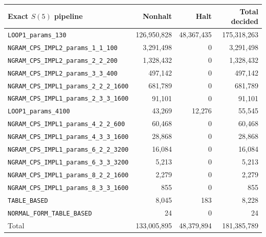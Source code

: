 \documentclass[a4paper,british]{article}
\theoremstyle{definition} %
\numberwithin{equation}{section}
\theoremstyle{definition} %
\begin{document}
\begin{table}[H]
    \centering

    \begin{tabular}{|lrrr|}
        \hline
        Exact $S(5)$ pipeline                             & Nonhalt         & Halt           & Total decided   \\
        \hline
        \texttt{LOOP1\_params\_130}                       & 126{,}950{,}828 & 48{,}367{,}435 & 175{,}318{,}263 \\
        \texttt{NGRAM\_CPS\_IMPL2\_params\_1\_1\_100}     & 3{,}291{,}498   & 0              & 3{,}291{,}498   \\
        \texttt{NGRAM\_CPS\_IMPL2\_params\_2\_2\_200}     & 1{,}328{,}432   & 0              & 1{,}328{,}432   \\
        \texttt{NGRAM\_CPS\_IMPL2\_params\_3\_3\_400}     & 497{,}142       & 0              & 497{,}142       \\
        \texttt{NGRAM\_CPS\_IMPL1\_params\_2\_2\_2\_1600} & 681{,}789       & 0              & 681{,}789       \\
        \texttt{NGRAM\_CPS\_IMPL1\_params\_2\_3\_3\_1600} & 91{,}101        & 0              & 91{,}101        \\
        \texttt{LOOP1\_params\_4100}                      & 43{,}269        & 12{,}276       & 55{,}545        \\
        \texttt{NGRAM\_CPS\_IMPL1\_params\_4\_2\_2\_600}  & 60{,}468        & 0              & 60{,}468        \\
        \texttt{NGRAM\_CPS\_IMPL1\_params\_4\_3\_3\_1600} & 28{,}868        & 0              & 28{,}868        \\
        \texttt{NGRAM\_CPS\_IMPL1\_params\_6\_2\_2\_3200} & 16{,}084        & 0              & 16{,}084        \\
        \texttt{NGRAM\_CPS\_IMPL1\_params\_6\_3\_3\_3200} & 5{,}213         & 0              & 5{,}213         \\
        \texttt{NGRAM\_CPS\_IMPL1\_params\_8\_2\_2\_1600} & 2{,}279         & 0              & 2{,}279         \\
        \texttt{NGRAM\_CPS\_IMPL1\_params\_8\_3\_3\_1600} & 855             & 0              & 855             \\
        \texttt{TABLE\_BASED}                             & 8{,}045         & 183            & 8{,}228         \\
        \texttt{NORMAL\_FORM\_TABLE\_BASED}               & 24              & 0              & 24              \\
        \hline
        Total                                             & 133{,}005{,}895 & 48{,}379{,}894 & 181{,}385{,}789 \\
        \hline
    \end{tabular}
\end{table}
\end{document}

